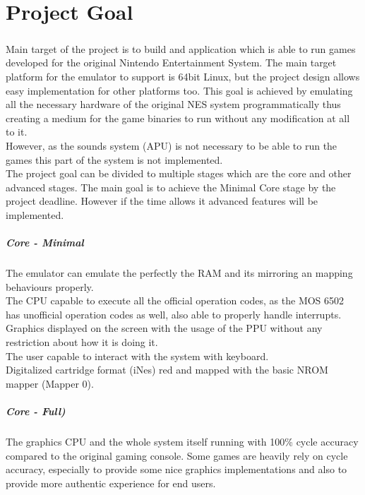 \documentclass[]{report}
\begin{document}
\chapter{Project Goal}
\paragraph{ }
Main target of the project is to build and application which is able to run games developed for the original Nintendo Entertainment System. The main target platform for the emulator to support is 64bit Linux, but the project design allows easy implementation for other platforms too. This goal is achieved by emulating all the necessary hardware of the original NES system programmatically thus creating a medium for the game binaries to run without any modification at all to it. 
\\ 
However, as the sounds system (APU) is not necessary to be able to run the games this part of the system is not implemented.
\\
The project goal can be divided to multiple stages which are the core and other advanced stages.
The main goal is to achieve the Minimal Core stage by the project deadline. However if the time allows it  advanced features will be implemented. 
\paragraph{Core - Minimal}
The emulator can emulate the perfectly the RAM and its mirroring an mapping behaviours properly. 
\\
The CPU capable to execute all the official operation codes, as the MOS 6502 has unofficial operation codes as well, also able to properly handle interrupts. 
\\ 
Graphics displayed on the screen with the usage of the PPU without any restriction about how it is doing it.
\\ 
The user capable to interact with the system with keyboard.
\\ 
Digitalized cartridge format (iNes) red and mapped with the basic NROM mapper (Mapper 0).
\paragraph{Core - Full)}
The graphics CPU and the whole system itself running with 100\% cycle accuracy compared to the original gaming console.
Some games are heavily rely on cycle accuracy, especially to provide some nice graphics implementations and also to provide more authentic experience for end users.
\end{document}
